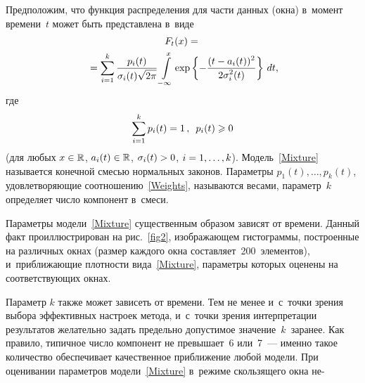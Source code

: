 \begin{multicols}{2}
Предположим, что функция распределения для части данных (окна) 
в~момент времени~$t$ может быть представлена в~виде
\begin{multline}
F_t(x)={}\\
{}=\sum\limits_{i=1}^k
\displaystyle\frac{\displaystyle p_i(t)\mathstrut}{\displaystyle \sigma_i(t)\sqrt{2\pi}\mathstrut}\int\limits_{-\infty}^{x}\exp
\left\{-\displaystyle\frac{\displaystyle (t-a_i
(t))^2\mathstrut}{\displaystyle 2\sigma_i^2(t)\mathstrut}\right\}\,dt, 
\label{Mixture}
\end{multline}
где 
\begin{equation}
\sum\limits_{i=1}^{k}p_{i}(t)=1\,, \enskip
p_{i}(t)\geqslant 0 \label{Weights}
\end{equation}
(для любых $x \in \mathbb R$,  $a_i(t)\hm\in\R$, $\sigma_i(t)\hm>0$,
$i\hm=1,\ldots,k$). Модель~\eqref{Mixture} называется конечной смесью
нормальных законов. Параметры $p_{1}(t),\ldots,p_{k}(t)$,
удовлетворяющие соотношению~\eqref{Weights}, называются весами,
параметр~$k$ определяет число компонент в~смеси.

Параметры модели~\eqref{Mixture} существенным образом зависят от
времени. Данный факт проиллюстрирован на рис.~\ref{fig2},
изображающем гистограммы, построенные на различных окнах
(размер каждого окна составляет~200~элементов), и~приближающие
плотности вида~\eqref{Mixture}, параметры которых оценены на
соответствующих окнах.



Параметр  $k$ также может зависеть от времени. Тем не менее 
и~с~точки зрения выбора эффективных
 настроек метода, и~с~точки зрения
интерпретации результатов желательно задать предельно допустимое
значение~$k$~заранее. Как правило, типичное чис\-ло компонент не
превышает~6 или~7~--- именно  такое количество обеспечивает
качественное приближение любой модели. При оценивании параметров
модели~\eqref{Mixture} в~режиме скользящего окна не-\linebreak\vspace*{-12pt}

\pagebreak

\end{multicols}

\begin{figure} %
\vspace*{1pt}
 \begin{center}
 \mbox{%
 \epsfxsize=162.699mm
 }
 \end{center}
 \vspace*{-12pt}
\vspace*{-3pt}
\end{figure}

